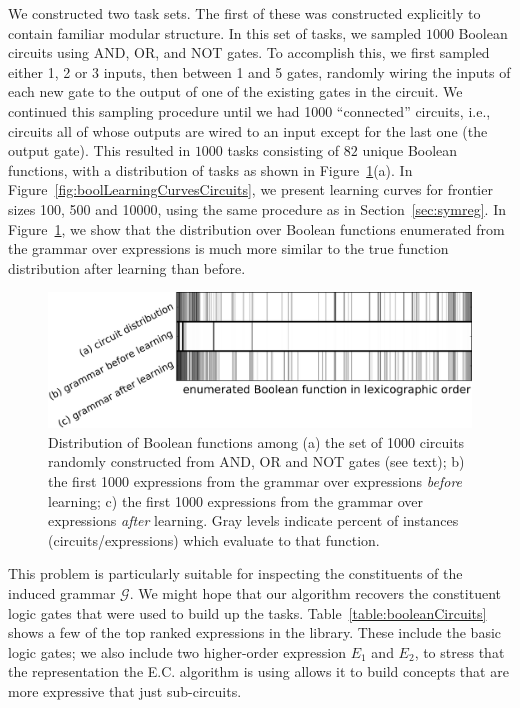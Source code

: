 \documentclass{article}
\begin{document}
We constructed two task sets. The first of these was constructed
explicitly to contain familiar modular structure. In this set of
tasks, we sampled $1000$ Boolean circuits using AND, OR, and NOT
gates. To accomplish this, we first sampled either 1, 2 or 3 inputs,
then between 1 and 5 gates, randomly wiring the inputs of each new
gate to the output of one of the existing gates in the circuit. We
continued this sampling procedure until we had 1000 ``connected''
circuits, i.e., circuits all of whose outputs are wired to an input
except for the last one (the output gate). This resulted in $1000$
tasks consisting of $82$ unique Boolean functions, with a distribution
of tasks as shown in Figure~\ref{fig:booldistr}(a). In
Figure~\ref{fig:boolLearningCurvesCircuits}, we present learning
curves for frontier sizes 100, 500 and 10000, using the same procedure
as in Section~\ref{sec:symreg}. In Figure~\ref{fig:booldistr}, we show
that the distribution over Boolean functions enumerated from the
grammar over expressions is much more similar to the true function
distribution after learning than before.

\begin{figure}
\includegraphics[width=\linewidth]{figures/circuitDistrComp2.png}
\caption{Distribution of Boolean functions among (a) the set of 1000
  circuits randomly constructed from AND, OR and NOT gates (see text);
  b) the first 1000 expressions from the grammar over expressions
  \emph{before} learning; c) the first 1000 expressions from the
  grammar over expressions \emph{after} learning. Gray levels indicate
  percent of instances (circuits/expressions) which evaluate to that
  function.\label{fig:booldistr}}
\end{figure}

This problem is particularly suitable for inspecting the constituents
of the induced grammar $\mathcal{G}$. We might hope that our algorithm
recovers the constituent logic gates that were used to build up the
tasks. Table~\ref{table:booleanCircuits} shows a few of the top ranked
expressions in the library. These include the basic logic gates; we
also include two higher-order expression $E_1$ and $E_2$, to stress
that the representation the E.C. algorithm is using allows it to build
concepts that are more expressive that just sub-circuits.
\end{document}
